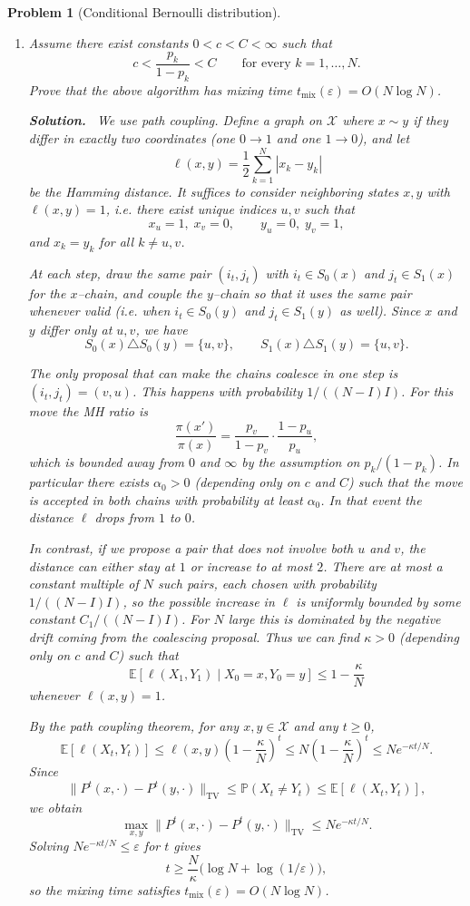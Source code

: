\documentclass[11pt]{article}
\newtheorem{problem}{Problem}
\newenvironment{solution}{\par\noindent\textbf{Solution.}\ }{\par}
\begin{document}
\begin{problem}[Conditional Bernoulli distribution]
\begin{enumerate}
\item Assume there exist constants $0 < c < C < \infty$ such that
\[
  c < \frac{p_k}{1-p_k} < C \qquad \text{for every } k = 1,\dots,N.
\]
Prove that the above algorithm has mixing time
$t_{\mathrm{mix}}(\varepsilon) = O(N\log N)$.

\begin{solution}
We use path coupling. Define a graph on $\mathcal{X}$ where $x \sim y$ if they
differ in exactly two coordinates (one $0 \to 1$ and one $1 \to 0$), and let
\[
  \ell(x,y) = \frac{1}{2} \sum_{k=1}^N |x_k - y_k|
\]
be the Hamming distance. It suffices to consider neighboring states $x,y$ with
$\ell(x,y) = 1$, i.e. there exist unique indices $u,v$ such that
\[
  x_u = 1, \; x_v = 0, \qquad y_u = 0, \; y_v = 1,
\]
and $x_k = y_k$ for all $k \neq u,v$.

At each step, draw the same pair $(i_t,j_t)$ with $i_t \in S_0(x)$ and
$j_t \in S_1(x)$ for the $x$–chain, and couple the $y$–chain so that it uses the
same pair whenever valid (i.e. when $i_t \in S_0(y)$ and $j_t \in S_1(y)$ as
well). Since $x$ and $y$ differ only at $u,v$, we have
\[
  S_0(x) \triangle S_0(y) = \{u,v\}, \qquad
  S_1(x) \triangle S_1(y) = \{u,v\}.
\]

The only proposal that can make the chains coalesce in one step is
$(i_t,j_t) = (v,u)$. This happens with probability $1/((N-I)I)$. For this move
the MH ratio is
\[
  \frac{\pi(x')}{\pi(x)} = \frac{p_v}{1-p_v}\cdot\frac{1-p_u}{p_u},
\]
which is bounded away from $0$ and $\infty$ by the assumption on $p_k/(1-p_k)$.
In particular there exists $\alpha_0>0$ (depending only on $c$ and $C$) such that
the move is accepted in both chains with probability at least $\alpha_0$. In that
event the distance $\ell$ drops from $1$ to $0$.

In contrast, if we propose a pair that does not involve both $u$ and $v$, the
distance can either stay at $1$ or increase to at most $2$. There are at most a
constant multiple of $N$ such pairs, each chosen with probability
$1/((N-I)I)$, so the possible increase in $\ell$ is uniformly bounded by some
constant $C_1/((N-I)I)$. For $N$ large this is dominated by the negative drift
coming from the coalescing proposal. Thus we can find $\kappa>0$ (depending only
on $c$ and $C$) such that
\[
  \mathbb{E}[\ell(X_1,Y_1) \mid X_0=x,Y_0=y] \le 1 - \frac{\kappa}{N}
\]
whenever $\ell(x,y)=1$.

By the path coupling theorem, for any $x,y \in \mathcal{X}$ and any $t \ge 0$,
\[
  \mathbb{E}[\ell(X_t,Y_t)]
  \le \ell(x,y)\left(1 - \frac{\kappa}{N}\right)^t
  \le N\left(1 - \frac{\kappa}{N}\right)^t
  \le N e^{-\kappa t/N}.
\]
Since
\[
  \|P^t(x,\cdot) - P^t(y,\cdot)\|_{\mathrm{TV}}
  \le \mathbb{P}(X_t \neq Y_t)
  \le \mathbb{E}[\ell(X_t,Y_t)],
\]
we obtain
\[
  \max_{x,y} \|P^t(x,\cdot) - P^t(y,\cdot)\|_{\mathrm{TV}}
  \le N e^{-\kappa t/N}.
\]
Solving $N e^{-\kappa t/N} \le \varepsilon$ for $t$ gives
\[
  t \ge \frac{N}{\kappa}\bigl(\log N + \log(1/\varepsilon)\bigr),
\]
so the mixing time satisfies $t_{\mathrm{mix}}(\varepsilon) = O(N\log N)$.\qedhere
\end{solution}


\end{enumerate}
\end{problem}
\end{document}
